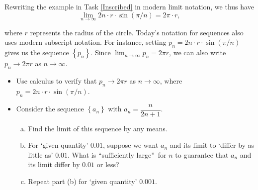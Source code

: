 \documentclass[11pt]{article}%
\newcounter{tasknumb}
\newcommand{\tasknumb}[1]{\refstepcounter{tasknumb}\textmd{\textbf{$\fbox{$\fbox{Task \thetasknumb}$}$}}#1}
\newenvironment{task}[1][]%
{\begin{itemize}
\item[\tasknumb{#1}] }
{
\end{itemize} }%
\begin{document}
\noindent Rewriting the  example in Task \ref{Inscribed} in modern limit notation, we thus have
\[ \lim_{n\rightarrow \infty} 2n\cdot r \cdot\sin\left(  \pi/n\right) = 2\pi \cdot r, \]

\noindent  where $r$ represents the radius of the circle. Today's notation  for sequences also  uses modern subscript notation. For instance, setting    $p_n = 2n\cdot r\cdot\sin\left(  \pi/n\right)$ gives us the sequence $\left\{  p_{n}\right\}  $.  Since $\displaystyle{\lim_{n\rightarrow \infty} p_n = 2\pi r}$, we can also write  $ p_{n} \rightarrow 2\pi r$ as $n\rightarrow \infty$.


\medskip
\begin{task}
Use calculus to verify that  $ p_{n} \rightarrow 2\pi r$ as $n\rightarrow \infty$, where   $p_n = 2n\cdot r\cdot\sin\left(  \pi/n\right)$.
\end{task}

\medskip

\begin{task}
Consider the sequence $\left\{  a_{n}\right\}  $ with $a_{n}=\dfrac{n}{2n+1}$.
\begin{enumerate}[(a)]
\item Find the limit of this sequence by any means.
\item  For `\textsf{given quantity}' $0.01$, suppose we
want $a_{n}$ and its limit to `\textsf{differ by as little as}' $0.01$. What
is \textquotedblleft sufficiently large\textquotedblright \ for $n$ to guarantee that $a_{n}$ and its limit differ
by  $0.01$ or less?
\item Repeat part (b) for  `\textsf{given quantity}' $0.001$.
\end{enumerate}
\end{task}



\end{document}
